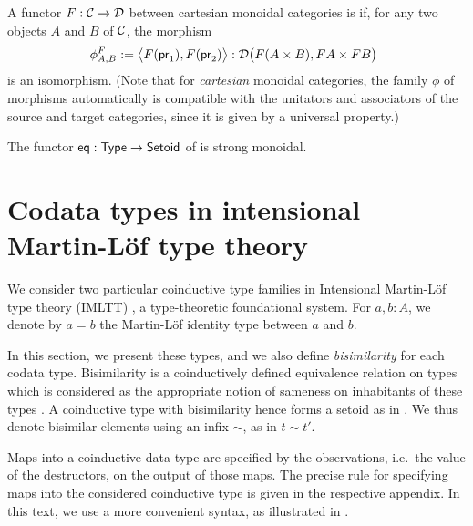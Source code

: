 \documentclass[envcountsame]{llncs}
\begin{document}
\begin{definition}\label{def:monoidal_functor}
 A functor $F:{\mathcal{C}}\to\mathcal{D}$ between cartesian monoidal categories is  if, for any two objects $A$ and $B$ of ${\mathcal{C}}$,
  the morphism
 \[ \phi^F_{A,B} := \bigl\langle F(\mathsf{pr}_1), F(\mathsf{pr}_2) \bigr\rangle : \mathcal{D}\bigl(F(A\times B), FA\times FB\bigr)\enspace  \] 
 is an isomorphism.
 (Note that for \emph{cartesian} monoidal categories, the family $\phi$ of morphisms automatically 
  is compatible with the unitators and associators of the source and target categories, 
  since it is given by a universal property.)
\end{definition}

\begin{example}
  The functor $\mathsf{eq}: \mathsf{Type} \to \mathsf{Setoid}$ of  is strong monoidal.
\end{example}


\section{Codata types in intensional Martin-L\"of type theory}\label{sec:tri}

We consider two particular coinductive type families in Intensional Martin-L\"of type theory (IMLTT) \parencite{martin_lof}, 
a type-theoretic foundational system.
For $a,b : A$, we denote by $a = b$ the Martin-L\"of identity type between $a$ and $b$.

In this section, we present these types, and we also define \emph{bisimilarity} for each codata type.
Bisimilarity is a coinductively defined equivalence relation on types which is considered 
as the appropriate notion of sameness on inhabitants of these types \parencite{DBLP:conf/types/Coquand93, DBLP:journals/corr/abs-cs-0603119}.
A coinductive type with bisimilarity hence forms a setoid as in .
We thus denote bisimilar elements using an infix $\sim$, as in $t \sim t'$. 

Maps into a coinductive data type are specified by the observations, i.e.\ the value of the destructors, on the output of those maps.  
The precise rule for specifying maps into the considered coinductive type is given in the respective appendix.
In this text, we use a more convenient syntax, as illustrated in .
\end{document}
